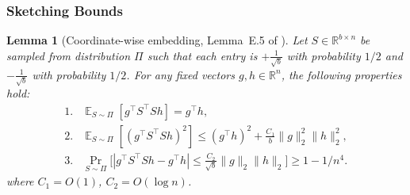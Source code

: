 \documentclass[11pt]{article}
\newtheorem{lemma}[theorem]{Lemma}
\renewcommand\gg{\boldsymbol{\mathit{g}}}
\newcommand\hh{\boldsymbol{\mathit{h}}}
\renewcommand\SS{\boldsymbol{\mathit{S}}}
\newcommand\R{\mathbb{R}}
\DeclareMathOperator*{\E}{{\mathbb{E}}}
\begin{document}
\subsubsection{Sketching Bounds}
\begin{lemma}[Coordinate-wise embedding, Lemma~E.5 of \cite{lsz19}]\label{lem:CE_one_sketch}
Let $\SS \in \R^{b \times n}$ be sampled from distribution $\Pi$ such that each entry is $+\frac{1}{\sqrt{b}}$ with probability $1/2$ and $-\frac{1}{\sqrt{b}}$ with probability $1/2$.
For any fixed vectors $\gg, \hh\in \R^n$, the following properties hold:
\begin{align*}
1. & \E_{\SS \sim \Pi}[ \gg^{\top} \SS^\top \SS \hh ] = \gg^{\top} \hh, \\
2. & \E_{\SS \sim \Pi}[ (\gg^{\top} \SS^\top \SS \hh )^2 ] \leq (\gg^{\top} \hh)^2 + \frac{C_1}{b} \|\gg\|_2^2 \| \hh \|_2^2, \\
3. & \Pr_{\SS \sim \Pi}\Big[ | \gg^{\top} \SS^\top \SS \hh - \gg^{\top} \hh | \leq \frac{ C_2 }{ \sqrt{b} } \|\gg\|_2 \| \hh \|_2 \Big] \geq 1 - 1 / n^4.
\end{align*}
where $C_1 = O(1)$, $C_2 = O(\log n)$.
\end{lemma}
\end{document}

